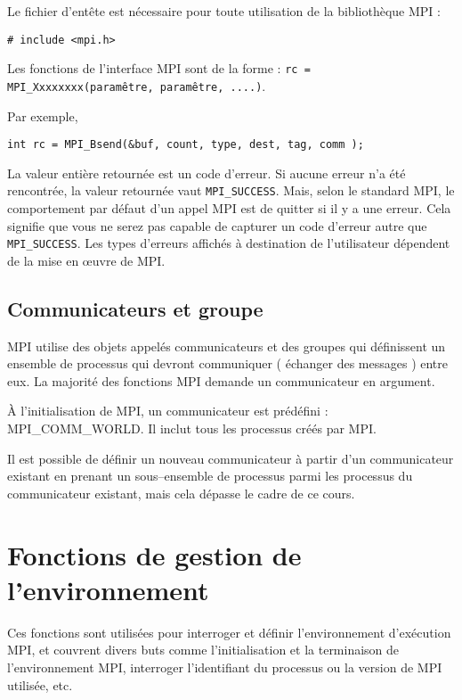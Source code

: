 \documentclass[11pt,a4paper]{article}
\begin{document}
Le fichier d'entête est nécessaire pour toute utilisation de la bibliothèque MPI :

\begin{lstlisting}
# include <mpi.h>
\end{lstlisting}

Les fonctions de l'interface MPI sont de la forme : \texttt{rc = MPI\_Xxxxxxxx(paramêtre, paramêtre, ....)}.

Par exemple, 
\begin{lstlisting}
int rc = MPI_Bsend(&buf, count, type, dest, tag, comm );
\end{lstlisting}

La valeur entière retournée est un code d'erreur. Si aucune erreur n'a été rencontrée, la valeur retournée
vaut \texttt{MPI\_SUCCESS}. Mais, selon le standard MPI, le comportement par défaut d'un appel MPI est
de quitter si il y a une erreur. Cela signifie que vous ne serez pas capable de capturer un code d'erreur
autre que \texttt{MPI\_SUCCESS}. Les types d'erreurs affichés à destination de l'utilisateur dépendent de la mise en
{\oe}uvre de MPI.

\subsection{Communicateurs et groupe}

MPI utilise des objets appelés communicateurs et des groupes qui définissent un ensemble de processus
qui devront communiquer ( échanger des messages ) entre eux. La majorité des fonctions MPI demande un
communicateur en argument.

\`A l'initialisation de MPI, un communicateur  est prédéfini : MPI\_COMM\_WORLD. Il inclut tous les
processus créés par MPI. 

Il est possible de définir un nouveau communicateur à partir d'un communicateur existant 
en prenant un sous--ensemble de processus parmi les processus du communicateur existant, mais cela
dépasse le cadre de ce cours.

\section{Fonctions de gestion de l'environnement}

Ces fonctions sont utilisées pour interroger et définir l'environnement d'exécution MPI, et couvrent divers buts comme
l'initialisation et la terminaison de l'environnement MPI, interroger l'identifiant du processus ou la version de MPI utilisée, etc. 
\end{document}
